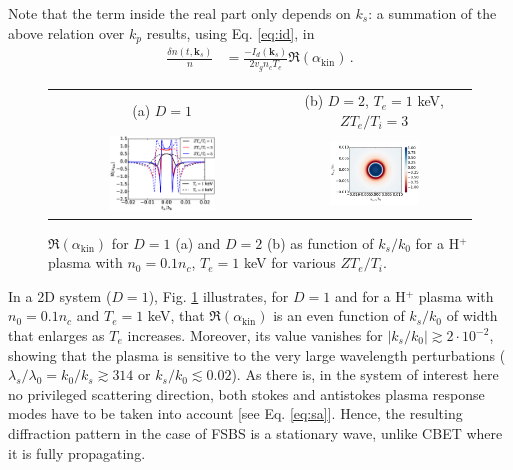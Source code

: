 \documentclass[
 reprint,
 amsmath,amssymb,
 aps,
]{revtex4-1}
\begin{document}
Note that the term inside the real part only depends on $k_s$:   a summation of the above relation over $k_p$ results, using Eq. \eqref{eq:id}, in  
\begin{align}
\frac{ \delta n (t,\mathbf{k}_s ) }{n}  &=   \frac{ -I_d(\mathbf{k}_s) }{ 2 v_g n_c T_e } 
 \Re \left( \alpha_\mathrm{kin}   \right)  
 \, .\label{eq:drakef}
\end{align}
\begin{figure}
\begin{tabular}{cc}
(a) $D=1$&
(b) $D=2$, $T_e=1$ keV, $ZT_e/T_i=3$\\
\includegraphics[width=0.49\textwidth]{akin.eps}&
\includegraphics[width=0.49\textwidth]{akinD2.png}
\end{tabular}
\caption{ \label{fig:akin}  
 $\Re \left( \alpha_\mathrm{kin}   \right)$ for $D=1$ (a) and $D=2$ (b) as function of $k_s/k_0$ for a H$^{+}$ plasma with $n_0=0.1n_c$, $T_e =1$ keV for various $ZT_e/T_i$. 
 }
\end{figure}
In a 2D system ($D=1$), Fig. \ref{fig:akin} illustrates, for $D=1$ and for  a H$^{+}$ plasma with $n_0=0.1n_c$ and  $T_e =1$ keV, that $\Re \left( \alpha_\mathrm{kin}   \right)$ is an even function  of $k_s/k_0$ of width that enlarges as  $T_e$ increases. Moreover, its value vanishes for $\vert k_s/k_0 \vert  \gtrsim 2 \cdot 10^{-2}$, showing that the plasma is sensitive  to the very large wavelength perturbations ($\lambda_s/\lambda_0=k_0/k_s\gtrsim 314 $ or $k_s/k_0\lesssim 0.02$).
As there is, in  the system of interest here no privileged scattering direction, both stokes and antistokes plasma response modes have to be taken into account [see Eq. \eqref{eq:sa}]. Hence,  the resulting diffraction pattern  in the case of FSBS is  a stationary  wave, unlike CBET where it is fully propagating.
\end{document}
